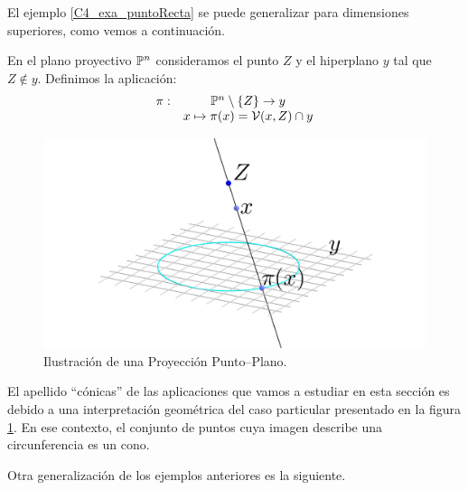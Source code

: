 El ejemplo \ref{C4_exa_puntoRecta} se puede generalizar para dimensiones superiores, como vemos a continuación.
\begin{exa}
	\label{C4_exa_puntoHiperplano}
	En el plano proyectivo $\mathbb{P}^n$ consideramos el punto $Z$ y el hiperplano $y$ tal que $Z\not\in y$. Definimos la aplicación:
	\[\begin{array}{cc}
	\pi:&\mathbb{P}^n\setminus\{Z\}\to y\\
	&x\mapsto \pi(x)=\mathcal{V}(x,Z)\cap y
	\end{array}\]
	\begin{figure}[h]
		\centering
		\includegraphics[scale=.3]{Graficos/puntoPlano.png}
		\caption{Ilustración de una Proyección Punto--Plano.}
		\label{C4_puntoPlano}
	\end{figure}
\end{exa}
\begin{obs}[Cónicas]
	\label{C4_obs_conicas}
	El apellido ``cónicas'' de las aplicaciones que vamos a estudiar en esta sección es debido a una interpretación geométrica del caso particular presentado en la figura \ref{C4_puntoPlano}. En ese contexto, el conjunto de puntos cuya imagen describe una circunferencia es un cono.
\end{obs}
Otra generalización de los ejemplos anteriores es la siguiente.
